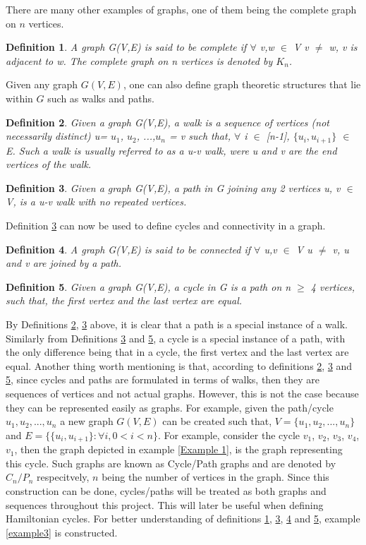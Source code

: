 \documentclass{article}
\newtheorem{definition}{Definition}[subsection]
\begin{document}
There are many other examples of graphs, one of them being the complete graph on $\mathit{n}$ vertices.
\begin{definition}
\label{Complete Graph}
A graph G(V,E) is said to be complete if $\forall$ v,w $\in$ V v $\neq$ w, v is adjacent to w. The complete graph on n vertices is denoted by $K_n$. 
\end{definition}
Given any graph $\mathit{G(V,E)}$, one can also define graph theoretic structures that lie within $\mathit{G}$ such as walks and paths.
\begin{definition}
\label{walk}
Given a graph G(V,E), a walk is a sequence of vertices (not necessarily distinct) u= $u_1$, $u_2$, ...,$u_n$ = v such that, $\forall$ i $\in$ [n-1], $\{u_i, u_{i+1}\}$ $\in$ E. Such a walk is usually referred to as a u-v walk, were u and v are the end vertices of the walk. 
\end{definition}
\begin{definition}
\label{Path}
Given a graph G(V,E), a path in G joining any 2 vertices u, v $\in$ V, is a u-v walk with no repeated vertices.
\end{definition}
Definition \ref{Path} can now be used to define cycles and connectivity in a graph.
\begin{definition}
\label{connectedgraph}
A graph G(V,E) is said to be connected if $\forall$ u,v $\in$ V u $\neq$ v, u and v are joined by a path. 
\end{definition}
\begin{definition}
\label{cycle}
Given a graph G(V,E), a cycle in G is a path on n $\geq$ 4 vertices, such that, the first vertex and the last vertex are equal.  
\end{definition}
By Definitions \ref{walk}, \ref{Path} above, it is clear that a path is a special instance of a walk. Similarly from Definitions \ref{Path} and \ref{cycle}, a cycle is a special instance of a path, with the only difference being that in a cycle, the first vertex and the last vertex are equal. Another thing worth mentioning is that, according to definitions \ref{walk}, \ref{Path} and \ref{cycle}, since cycles and paths are formulated in terms of walks, then they are sequences of vertices and not actual graphs. However, this is not the case because they can be represented easily as graphs. For example, given the path/cycle $\mathit{u_1, u_2, ...,u_n}$ a new graph $\mathit{G(V,E)}$ can be created such that, $\mathit{V= \{ u_1, u_2, ..., u_n\}}$ and $\mathit{E = \{ \{u_i, u_{i+1}\} : \forall i, 0 < i < n\}}$. For example, consider the cycle $v_1$, $v_2$, $v_3$, $v_4$, $v_1$, then the graph depicted in example \ref{Example 1}, is the graph representing this cycle. Such graphs are known as Cycle/Path graphs and are denoted by $\mathit{C_n/P_n}$ respecitvely, $\mathit{n}$ being the number of vertices in the graph. Since this construction can be done, cycles/paths will be treated as both graphs and sequences throughout this project. This will later be useful when defining Hamiltonian cycles. For better understanding of definitions \ref{Complete Graph}, \ref{Path}, \ref{connectedgraph} and \ref{cycle}, example \ref{example3} is constructed.
\end{document}
